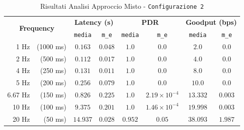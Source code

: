 \begin{table}[hbt!]
    \centering
    \begin{tabular}{ |rr|| c|c|c|c|c|c| } 
        \hline
        \multicolumn{2}{|c||}{\multirow{2}{*}{\textbf{Frequency}}} & \multicolumn{2}{|c|}{\textbf{Latency \scriptsize (s)}} & \multicolumn{2}{|c|}{\textbf{PDR}} & \multicolumn{2}{|c|}{\textbf{Goodput \scriptsize (bps)}} \\
        && \texttt{media} & \texttt{m\_e} & \texttt{media} & \texttt{m\_e} & \texttt{media} & \texttt{m\_e} \\

		\hline
 		1 Hz & \scriptsize (1000 ms) & $ 0.163 $ & $ 0.048 $ & $ 1.0 $ & $ 0.0 $ & $ 2.0 $ & $ 0.0 $ \\
		\hline
		2 Hz & \scriptsize (500 ms) & $ 0.112 $ & $ 0.017 $ & $ 1.0 $ & $ 0.0 $ & $ 4.0 $ & $ 0.0 $ \\
		\hline
		4 Hz & \scriptsize (250 ms) & $ 0.131 $ & $ 0.011 $ & $ 1.0 $ & $ 0.0 $ & $ 8.0 $ & $ 0.0 $ \\
		\hline
		5 Hz & \scriptsize (200 ms) & $ 0.256 $ & $ 0.079 $ & $ 1.0 $ & $ 0.0 $ & $ 10.0 $ & $ 0.0 $ \\
		\hline
		6.67 Hz & \scriptsize (150 ms) & $ 0.826 $ & $ 0.225 $ & $ 1.0 $ & $ 2.19 \times 10^{-4} $ & $ 13.332 $ & $ 0.003 $ \\
		\hline
		10 Hz & \scriptsize (100 ms) & $ 9.375 $ & $ 0.201 $ & $ 1.0 $ & $ 1.46 \times 10^{-4} $ & $ 19.998 $ & $ 0.003 $ \\
		\hline
		20 Hz & \scriptsize (50 ms) & $ 14.937 $ & $ 0.028 $ & $ 0.952 $ & $ 0.05 $ & $ 38.093 $ & $ 1.987 $ \\
		\hline
    \end{tabular}
    \caption{Risultati Analisi Approccio Misto - \texttt{Configurazione 2}}
    \label{tab:table_ble_wifi_conf_2}
\end{table}

